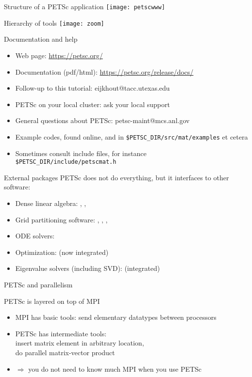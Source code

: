 \begin{numberedframe}{Structure of a PETSc application}
 \texttt{[image: petscwww]}
\end{numberedframe}

\begin{numberedframe}{Hierarchy of tools}
 \texttt{[image: zoom]}
\end{numberedframe}

\begin{numberedframe}{Documentation and help}
\begin{itemize}
\item Web page: \url{https://petsc.org/}
\item Documentation (pdf/html): \url{https://petsc.org/release/docs/}
\item Follow-up to this tutorial: eijkhout@tacc.utexas.edu
\item PETSc on your local cluster: ask your local support
\item General questions about PETSc: petsc-maint@mcs.anl.gov
\item Example codes, found online, and in \verb+$PETSC_DIR/src/mat/examples+
et cetera
\item Sometimes consult include files, for instance
\verb+$PETSC_DIR/include/petscmat.h+
\end{itemize}
\end{numberedframe}

\begin{details}
\begin{numberedframe}{External packages}
PETSc does not do everything, but it interfaces to other software:
  \begin{itemize}
  \item Dense linear algebra: , , 
  \item Grid partitioning software: , , , 
  \item ODE solvers: 
  \item Optimization:  (now integrated)
  \item Eigenvalue solvers (including SVD):  (integrated)
  \end{itemize}
\end{numberedframe}
\end{details}

\begin{numberedframe}{PETSc and parallelism}

PETSc is layered on top of MPI

\begin{itemize}
\item
MPI has basic tools: send elementary datatypes between processors
\item PETSc has intermediate tools:\\
insert matrix element in arbitrary location,\\
do parallel matrix-vector product
\item 
$\Rightarrow$ you do not need to know much MPI when you use PETSc
\end{itemize}
\end{numberedframe}

